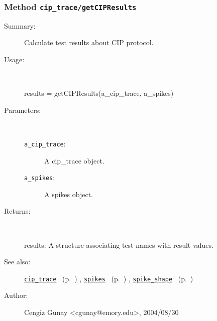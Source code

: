 \subsubsection[Method \texttt{getCIPResults}]{Method \texttt{cip\_trace/getCIPResults}}%
%
\label{ref_cip_trace__getCIPResults}%
\hypertarget{ref_cip_trace__getCIPResults}{}%
\begin{description}
\item[Summary:]Calculate test results about CIP protocol.
%
\item[Usage:]~%
\begin{lyxcode}%
results = getCIPResults(a\_cip\_trace, a\_spikes)
%
\end{lyxcode}%
%
%
\item[Parameters:]~
\begin{description}%
\item[\texttt{a\_cip\_trace}:]
 A cip\_trace object.
\item[\texttt{a\_spikes}:]
 A spikes object.
\end{description}%
%
\item[Returns:]~

	results: A structure associating test names with result values.
%
%
\item[See also:]%
\hyperlink{ref_cip_trace}{\texttt{cip\_trace}}%
\ (p.~\pageref{ref_cip_trace})%
%
, \hyperlink{ref_spikes}{\texttt{spikes}}%
\ (p.~\pageref{ref_spikes})%
%
, \hyperlink{ref_spike_shape}{\texttt{spike\_shape}}%
\ (p.~\pageref{ref_spike_shape})%
%
%
\item[Author:]%
Cengiz Gunay <cgunay@emory.edu>, 2004/08/30%
\end{description}
\methodline%
